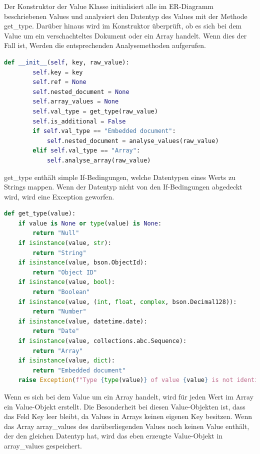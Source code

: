 Der Konstruktor der Value Klasse initialisiert alle im ER-Diagramm beschriebenen Values und analysiert den Datentyp des Values mit der Methode get\_type.
Darüber hinaus wird im Konstruktor überprüft, ob es sich bei dem Value um ein verschachteltes Dokument oder ein Array handelt. 
Wenn dies der Fall ist, Werden die entsprechenden Analysemethoden aufgerufen.

\begin{lstlisting}[language=python, caption={Value.\_\_init\_\_},label={lst:backend_value_init}]
    def __init__(self, key, raw_value):
        self.key = key
        self.ref = None
        self.nested_document = None
        self.array_values = None
        self.val_type = get_type(raw_value)
        self.is_additional = False
        if self.val_type == "Embedded document":
            self.nested_document = analyse_values(raw_value)
        elif self.val_type == "Array":
            self.analyse_array(raw_value)
\end{lstlisting}

get\_type enthält simple If-Bedingungen, welche Datentypen eines Werts zu Strings mappen.
Wenn der Datentyp nicht von den If-Bedingungen abgedeckt wird, wird eine Exception geworfen.

\begin{lstlisting}[language=python, caption={Value.get\_type},label={lst:backend_value_get_type}]
def get_type(value):
    if value is None or type(value) is None:
        return "Null"
    if isinstance(value, str):
        return "String"
    if isinstance(value, bson.ObjectId):
        return "Object ID"
    if isinstance(value, bool):
        return "Boolean"
    if isinstance(value, (int, float, complex, bson.Decimal128)):
        return "Number"
    if isinstance(value, datetime.date):
        return "Date"
    if isinstance(value, collections.abc.Sequence):
        return "Array"
    if isinstance(value, dict):
        return "Embedded document"
    raise Exception(f"Type {type(value)} of value {value} is not identifiable!")
\end{lstlisting}

Wenn es sich bei dem Value um ein Array handelt, wird für jeden Wert im Array ein Value-Objekt erstellt.
Die Besonderheit bei diesen Value-Objekten ist, dass das Feld Key leer bleibt, da Values in Arrays keinen eigenen Key besitzen.
Wenn das Array array\_values des darüberliegenden Values noch keinen Value enthält, der den gleichen Datentyp hat, wird das eben erzeugte Value-Objekt in array\_values gespeichert.

